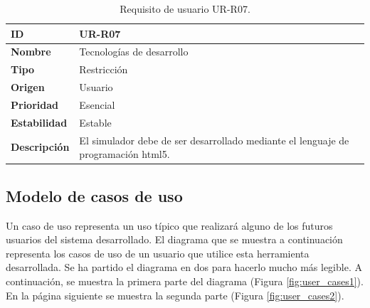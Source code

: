 \begin{center}
\begin{table}[htbp]
\centering
\caption{Requisito de usuario UR-R07.}
\begin{tabular}{@{}p{2.5cm} p{9cm}@{}} 
\toprule
\textbf{ID} 				& UR-R07 \\
\midrule
\textbf{Nombre} 			& Tecnologías de desarrollo \\
\midrule
\textbf{Tipo} 			& Restricción \\
\midrule
\textbf{Origen} 			& Usuario \\
\midrule
\textbf{Prioridad}		& Esencial \\
\midrule
\textbf{Estabilidad} 		& Estable \\
\midrule
\textbf{Descripción} 	& El simulador debe de ser desarrollado mediante el lenguaje de programación \acrshort{html}5. \\
\bottomrule
\end{tabular}
\label{tab:urr07}
\end{table}
\end{center}

\subsection{Modelo de casos de uso}
\label{sec:user_cases}

Un caso de uso representa un uso típico que realizará alguno de los futuros usuarios del sistema desarrollado. El diagrama que se muestra a continuación representa los casos de uso de un usuario que utilice esta herramienta desarrollada. Se ha partido el diagrama en dos para hacerlo mucho más legible. A continuación, se muestra la primera parte del diagrama (Figura \ref{fig:user_cases1}). En la página siguiente se muestra la segunda parte (Figura \ref{fig:user_cases2}).

